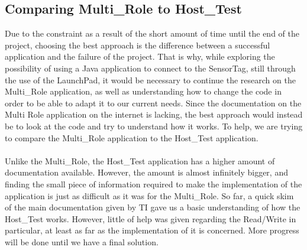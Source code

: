 \documentclass[conference,12pt]{IEEETran}
\begin{document}
\subsection{Comparing Multi\_Role to Host\_Test}
Due to the constraint as a result of the short amount of time until the end of the project, choosing the best approach is the difference between a successful application and the failure of the project. That is why, while exploring the possibility of using a Java application to connect to the SensorTag, still through the use of the LaunchPad, it would be necessary to continue the research on the Multi\_Role application, as well as understanding how to change the code in order to be able to adapt it to our current needs. Since the documentation on the Multi Role application on the internet is lacking, the best approach would instead be to look at the code and try to understand how it works. To help, we are trying to compare the Multi\_Role application to the Host\_Test application.\\\\
Unlike the Multi\_Role, the Host\_Test application has a higher amount of documentation available. However, the amount is almost infinitely bigger, and finding the small piece of information required to make the implementation of the application is just as difficult as it was for the Multi\_Role. So far, a quick skim of the main documentation given by TI gave us a basic understanding of how the Host\_Test works. However, little of help was given regarding the Read/Write in particular, at least as far as the implementation of it is concerned. More progress will be done until we have a final solution.\\



\printbibliography
\end{document}
